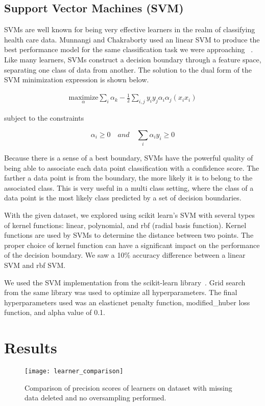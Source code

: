 \documentclass[conference]{IEEEtran}
\begin{document}
\subsection{Support Vector Machines (SVM)}
SVMs are well known for being very effective learners in the realm of classifying health care data. Munnangi and Chakraborty used an linear SVM to produce the best performance model for the same classification task we were approaching ~\cite{sas-2015}. Like many learners, SVMs construct a decision boundary through a feature space, separating one class of data from another. The solution to the dual form of the SVM minimization expression is shown below.

\[
\begin{aligned}
\underset{\alpha}{\text{maximize}} \sum_i \alpha_k - \frac{1}{2} \sum_{i, j} y_i y_j \alpha_i \alpha_j (x_i x_i)
\end{aligned}
\]

subject to the constraints

\[
\alpha_i \ge 0 \quad and \quad \sum_i \alpha_i y_i \ge 0
\]

Because there is a sense of a best boundary, SVMs have the powerful quality of being able to associate each data point classification with a confidence score. The farther a data point is from the boundary, the more likely it is to belong to the associated class. This is very useful in a multi class setting, where the class of a data point is the most likely class predicted by a set of decision boundaries.

With the given dataset, we explored using scikit learn's SVM with several types of kernel functions: linear, polynomial, and rbf (radial basis function). Kernel functions are used by SVMs to determine the distance between two points. The proper choice of kernel function can have a significant impact on the performance of the decision boundary. We saw a 10\% accuracy difference between a linear SVM and rbf SVM.

We used the SVM implementation from the scikit-learn library~\cite{scikit-learn}. Grid search from the same library was used to optimize all hyperparameters. The final hyperparameters used was an elasticnet penalty function, modified_huber loss function, and alpha value of 0.1.

\section{Results}

\begin{figure*}[htpb]
	\centering
	\texttt{[image: learner\_comparison]}
	\caption{Comparison of precision scores of learners on dataset with missing data deleted and no oversampling performed.}
	\label{fig:learner_comp}
\end{figure*}
\end{document}
